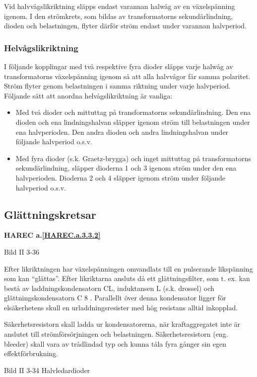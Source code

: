 Vid halvvågslikriktning släpps endast varannan halwåg av en
växelspänning igenom. I den strömkrets, som bildas av transformatorns
sekundärlindning, dioden och belastningen, flyter därför ström endast
under varannan halvperiod.

\subsubsection{Helvågslikriktning}
I följande kopplingar med två respektive fyra dioder släpps varje
halwåg av transformatorns växelspänning igenom så att alla halvvågor
får samma polaritet. Ström flyter genom belastningen i samma riktning
under varje halvperiod. Följande sätt att anordna helvågslikriktning
är vanliga:
\begin{itemize}
\item Med två dioder och mittuttag på transformatorns
  sekundärlindning. Den ena dioden och ena lindningshalvan släpper
  igenom ström till belastningen under ena halvperioden. Den andra
  dioden och andra lindningshalvan under följande halvperiod o.s.v.

\item Med fyra dioder (s.k. Graetz-brygga) och inget mittuttag på
  transformatorns sekundärlindning, släpper dioderna 1 och 3 igenom
  ström under den ena halvperioden.  Dioderna 2 och 4 släpper igenom
  ström under följande halvperiod o.s.v.
\end{itemize}

\subsection{Glättningskretsar}
\textbf{HAREC a.\ref{HAREC.a.3.3.2}\label{myHAREC.a.3.3.2}}

Bild II 3-36

Efter likriktningen har växelspänningen omvandlats till en pulserande
likspänning som kan ``glättas''. Efter likriktarna ansluts då ett
glättningsfilter, som t. ex. kan bestå av laddningskondensatorn CL,
induktansen L (s.k.  drossel) och glättningskondensatorn C 8 .
Parallellt över denna kondensator ligger för elsäkerhetens skull en
urladdningsresister med hög resistans alltid inkopplad.

Säkerhetsresistorn skall ladda ur kondensatorerna, när kraftaggregatet
inte är anslutet till strömförsörjningen och
belastningen. Säkerhetsresistorn (eng. bleeder) skall vara av
trådlindad typ och kunna tåla fyra gånger sin egen effektförbrukning.

Bild II 3-34 Halvledardioder

